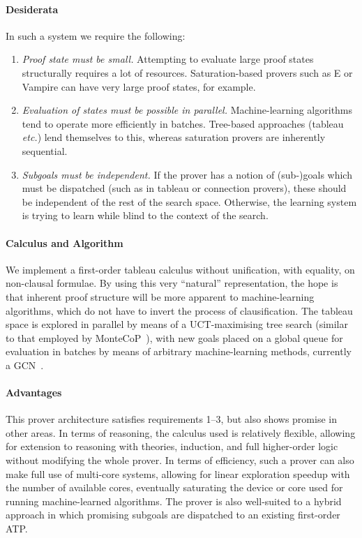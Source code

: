 \documentclass{easychair}
\begin{document}
\paragraph{Desiderata}
In such a system we require the following:
\begin{enumerate}
	\item \emph{Proof state must be small.} Attempting to evaluate large proof states structurally requires a lot of resources. Saturation-based provers such as E or Vampire can have very large proof states, for example.
	\item \emph{Evaluation of states must be possible in parallel.} Machine-learning algorithms tend to operate more efficiently in batches. Tree-based approaches (tableau \emph{etc.}) lend themselves to this, whereas saturation provers are inherently sequential.
	\item \emph{Subgoals must be independent.} If the prover has a notion of (sub-)goals which must be dispatched (such as in tableau or connection provers), these should be independent of the rest of the search space. Otherwise, the learning system is trying to learn while blind to the context of the search.
\end{enumerate}

\paragraph{Calculus and Algorithm}
We implement a first-order tableau calculus without unification, with equality, on non-clausal formulae.
By using this very ``natural'' representation, the hope is that inherent proof structure will be more apparent to machine-learning algorithms, which do not have to invert the process of clausification.
The tableau space is explored in parallel by means of a UCT-maximising tree search (similar to that employed by MonteCoP~\cite{montecop}), with new goals placed on a global queue for evaluation in batches by means of arbitrary machine-learning methods, currently a GCN~\cite{GCN, gcn-premise}.

\paragraph{Advantages}
This prover architecture satisfies requirements 1--3, but also shows promise in other areas.
In terms of reasoning, the calculus used is relatively flexible, allowing for extension to reasoning with theories, induction, and full higher-order logic without modifying the whole prover.
In terms of efficiency, such a prover can also make full use of multi-core systems, allowing for linear exploration speedup with the number of available cores, eventually saturating the device or core used for running machine-learned algorithms.
The prover is also well-suited to a hybrid approach in which promising subgoals are dispatched to an existing first-order ATP.
\end{document}
